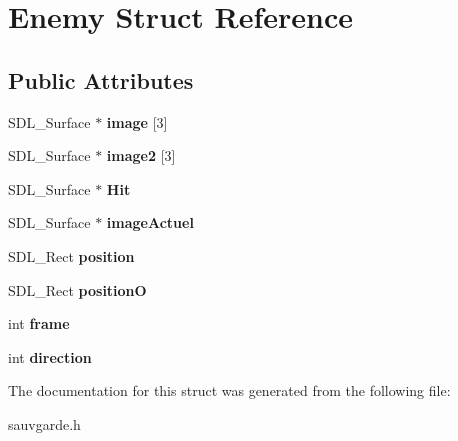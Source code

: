 \hypertarget{structEnemy}{}\section{Enemy Struct Reference}
\label{structEnemy}
\subsection*{Public Attributes}
\begin{DoxyCompactItemize}
\item 
\mbox{\label{structEnemy_afc1cf868e4b6602d2166ee9cfbf1d06e}} 
S\+D\+L\+\_\+\+Surface $\ast$ {\bfseries image} \mbox{[}3\mbox{]}
\item 
\mbox{\label{structEnemy_a43bdca7bc81657fccdb7d8cb7369f673}} 
S\+D\+L\+\_\+\+Surface $\ast$ {\bfseries image2} \mbox{[}3\mbox{]}
\item 
\mbox{\label{structEnemy_a62ed00c1aa4ac7bb90cb132c6c56b21d}} 
S\+D\+L\+\_\+\+Surface $\ast$ {\bfseries Hit}
\item 
\mbox{\label{structEnemy_ab8d7f9eceeef8f17331210f3f1fd2cf3}} 
S\+D\+L\+\_\+\+Surface $\ast$ {\bfseries image\+Actuel}
\item 
\mbox{\label{structEnemy_ac364f2ddf130c8622889deca0b6ba4d0}} 
S\+D\+L\+\_\+\+Rect {\bfseries position}
\item 
\mbox{\label{structEnemy_ab2e55fdee92a7689185599a67f726b41}} 
S\+D\+L\+\_\+\+Rect {\bfseries positionO}
\item 
\mbox{\label{structEnemy_a554574b1537da808a14f909b8a701735}} 
int {\bfseries frame}
\item 
\mbox{\label{structEnemy_a1de1605c4b41f74c3b0f4023258323ab}} 
int {\bfseries direction}
\end{DoxyCompactItemize}


The documentation for this struct was generated from the following file\+:\begin{DoxyCompactItemize}
\item 
sauvgarde.\+h\end{DoxyCompactItemize}
